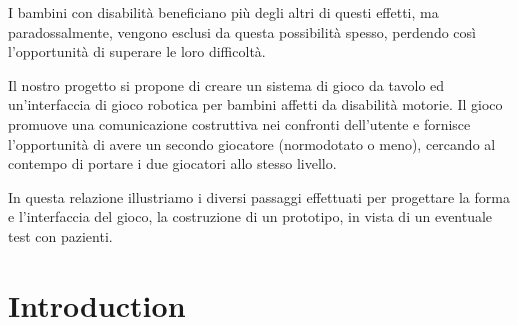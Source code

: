 \documentclass[a4paper,twoside]{book}
\begin{document}
I bambini con disabilit\`{a} beneficiano pi\`{u} degli altri di questi effetti, ma paradossalmente, vengono esclusi da questa possibilit\`{a} spesso, perdendo cos\`{i} l'opportunit\`{a} di superare le loro difficolt\`{a}.

Il nostro progetto si propone di creare un sistema di gioco da tavolo ed un'interfaccia di gioco robotica per bambini affetti da disabilit\`{a} motorie. Il gioco promuove una comunicazione costruttiva nei confronti dell'utente e fornisce l'opportunit\`{a} di avere un secondo giocatore (normodotato o meno), cercando al contempo di portare i due giocatori allo stesso livello.

In questa relazione illustriamo i diversi passaggi effettuati per progettare la forma e l'interfaccia del gioco, la costruzione di un prototipo, in vista di un eventuale test con pazienti.
 
\chapter{Introduction}
\end{document}
